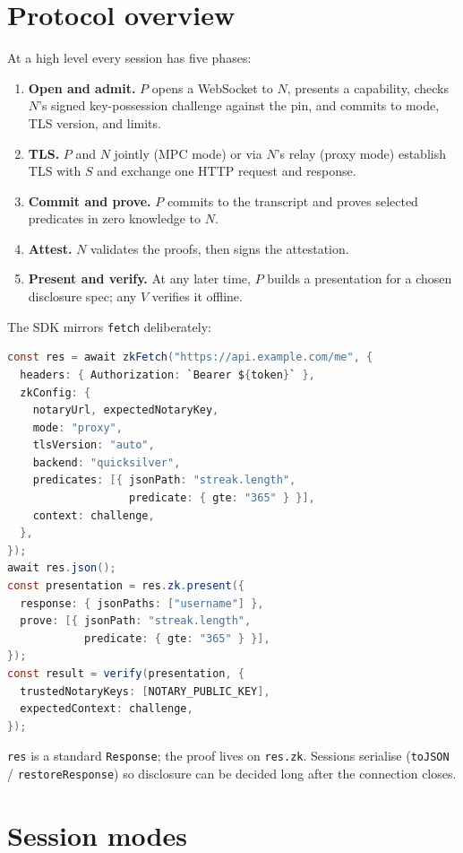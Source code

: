 \documentclass[11pt,a4paper]{article}
\begin{document}
\section{Protocol overview}

At a high level every session has five phases:

\begin{enumerate}[leftmargin=2em]
\item \textbf{Open and admit.} $P$ opens a WebSocket to $N$, presents a
capability, checks $N$'s signed key-possession challenge against the pin, and
commits to mode, TLS version, and limits.
\item \textbf{TLS.} $P$ and $N$ jointly (MPC mode) or via $N$'s relay (proxy
mode) establish TLS with $S$ and exchange one HTTP request and response.
\item \textbf{Commit and prove.} $P$ commits to the transcript and proves
selected predicates in zero knowledge to $N$.
\item \textbf{Attest.} $N$ validates the proofs, then signs the attestation.
\item \textbf{Present and verify.} At any later time, $P$ builds a presentation
for a chosen disclosure spec; any $V$ verifies it offline.
\end{enumerate}

The SDK mirrors \texttt{fetch} deliberately:

\begin{lstlisting}[language=Java]
const res = await zkFetch("https://api.example.com/me", {
  headers: { Authorization: `Bearer ${token}` },
  zkConfig: {
    notaryUrl, expectedNotaryKey,
    mode: "proxy",
    tlsVersion: "auto",
    backend: "quicksilver",
    predicates: [{ jsonPath: "streak.length",
                   predicate: { gte: "365" } }],
    context: challenge,
  },
});
await res.json();
const presentation = res.zk.present({
  response: { jsonPaths: ["username"] },
  prove: [{ jsonPath: "streak.length",
            predicate: { gte: "365" } }],
});
const result = verify(presentation, {
  trustedNotaryKeys: [NOTARY_PUBLIC_KEY],
  expectedContext: challenge,
});
\end{lstlisting}

\texttt{res} is a standard \texttt{Response}; the proof lives on
\texttt{res.zk}. Sessions serialise (\texttt{toJSON} / \texttt{restoreResponse})
so disclosure can be decided long after the connection closes.

\section{Session modes}
\end{document}
